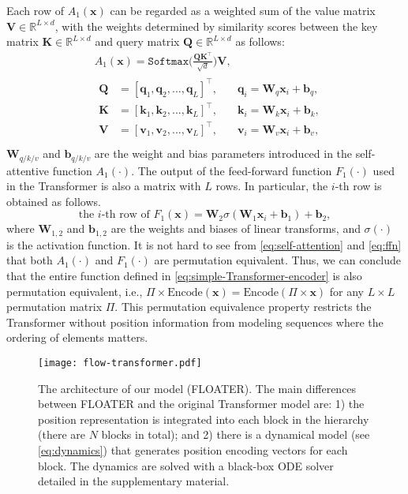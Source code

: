 \documentclass[11pt]{article}
\def\vb{{\bm{b}}}
\def\vk{{\bm{k}}}
\def\vq{{\bm{q}}}
\def\vv{{\bm{v}}}
\def\vx{{\bm{x}}}
\def\mK{{\bm{K}}}
\def\mQ{{\bm{Q}}}
\def\mV{{\bm{V}}}
\def\mW{{\bm{W}}}
\def\sR{{\mathbb{R}}}
\begin{document}
Each row of $A_1(\vx)$ can be regarded as a weighted sum of the value matrix $\mV\in\sR^{L\times d}$, with the weights determined by similarity
scores between the key matrix $\mK\in\sR^{L\times d}$ and query matrix $\mQ\in\sR^{L\times d}$ as follows:
\begin{equation}
    \label{eq:self-attention}
    \begin{aligned}
    &A_1(\vx)=\texttt{Softmax}\Big(\frac{\mQ\mK^\top}{\sqrt{d}}\Big)\mV,\\
    &\begin{aligned}
   \mQ &= [\vq_1,\vq_2,...,\vq_L]^\top,\quad &\vq_i= \mW_q \vx_i + \vb_q,\\
   \mK &= [\vk_1,\vk_2,...,\vk_L]^\top,\quad &\vk_i= \mW_k \vx_i + \vb_k, \\
   \mV &= [\vv_1, \vv_2,...,\vv_L]^\top,\quad &\vv_i= \mW_v \vx_i + \vb_v, \\
   \end{aligned} 
    \end{aligned}
\end{equation}
$\mW_{q/k/v}$ and $\vb_{q/k/v}$ are the weight and bias parameters introduced in the self-attentive function $A_1(\cdot)$. 
The output of the feed-forward function $F_1(\cdot)$ used in the Transformer is also a matrix with $L$ rows. In particular, the $i$-th row is obtained as follows.
\begin{equation}
    \label{eq:ffn}
    \text{the $i$-th row of } F_1(\vx) = \mW_2 \sigma(\mW_1\vx_i + \vb_1) +\vb_2,
\end{equation}
where $\mW_{1,2}$ and $\vb_{1,2}$ are the weights and biases of linear transforms, and $\sigma(\cdot)$ is the activation function. It is not hard to see from \eqref{eq:self-attention} and \eqref{eq:ffn} that both $A_1(\cdot)$ and $F_1(\cdot)$ are permutation equivalent. Thus, we can conclude that the entire function defined in \eqref{eq:simple-Transformer-encoder} is also permutation equivalent, i.e., $\Pi\times \text{Encode}(\vx) = \text{Encode} \left(\Pi \times \vx\right)$ for any $L\times L$ permutation matrix $\Pi$. 
This permutation equivalence property restricts the Transformer without position information from modeling sequences where the ordering of elements matters. 

\begin{figure*}[htb]
    \centering
    \texttt{[image: flow-transformer.pdf]}
    \caption{The architecture of our model (FLOATER). The main differences between FLOATER and the original Transformer model are: 1) the position representation is integrated into each block in the hierarchy (there are $N$ blocks in total); and 2) there is a dynamical model (see \eqref{eq:dynamics}) that generates position encoding vectors for each block. The dynamics are solved with a black-box ODE solver detailed in the supplementary material. }
    \label{fig:arch-flow-Transformer}
\end{figure*}
\end{document}

